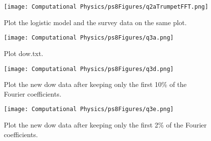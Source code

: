 \documentclass[11pt]{article}
\begin{document}
\begin{figure}[b!]
\centering
\texttt{[image: Computational Physics/ps8Figures/q2aTrumpetFFT.png]}
\caption{Plot the logistic model and the survey data on the same plot.}
  \label{fig:Q2TrumpetFFT}
\end{figure}

\begin{figure}[b!]
\centering
\texttt{[image: Computational Physics/ps8Figures/q3a.png]}
\caption{Plot dow.txt.}
  \label{fig:Q3a}
\end{figure}

\begin{figure}[b!]
\centering
\texttt{[image: Computational Physics/ps8Figures/q3d.png]}
\caption{Plot the new dow data after keeping only the first 10\% of the Fourier coefficients.}
  \label{fig:Q3d}
\end{figure}

\begin{figure}[b!]
\centering
\texttt{[image: Computational Physics/ps8Figures/q3e.png]}
\caption{Plot the new dow data after keeping only the first 2\% of the Fourier coefficients.}
  \label{fig:Q3e}
\end{figure}





\end{document}

